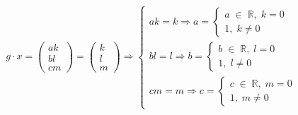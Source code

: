 \documentclass[a4paper,11pt]{article}
\begin{document}
\begin{gather*}
g \cdot x = 
\begin{pmatrix}
ak \\[2pt] 
bl \\[2pt]
cm
\end{pmatrix}  = 
\begin{pmatrix}
k \\[2pt] 
l \\[2pt]
m
\end{pmatrix} \Rightarrow
\begin{cases}
ak = k \Rightarrow a = \begin{cases} a \; \in \; \mathbb{R}, \; k = 0 \\ 1, \; k \neq 0 \end{cases} \\[2pt]
bl = l \Rightarrow b = \begin{cases} b \; \in \; \mathbb{R}, \; l = 0 \\ 1, \; l \neq 0 \end{cases} \\[2pt]
cm = m \Rightarrow c = \begin{cases} c \; \in \; \mathbb{R}, \; m = 0 \\ 1, \; m \neq 0 \end{cases}
\end{cases}
\end{gather*}
\\ \\ \\






\end{document}
